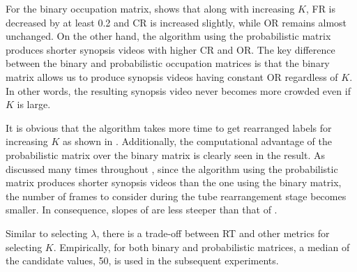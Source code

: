 \documentclass[11pt]{hyu_thesis}
\begin{document}
For the binary occupation matrix,  shows that along with increasing $K$, FR is decreased by at least 0.2 and CR is increased slightly, while OR remains almost unchanged. On the other hand, the algorithm using the probabilistic matrix produces shorter synopsis videos with higher CR and OR. The key difference between the binary and probabilistic occupation matrices is that the binary matrix allows us to produce synopsis videos having constant OR regardless of $K$. In other words, the resulting synopsis video never becomes more crowded even if $K$ is large.

It is obvious that the algorithm takes more time to get rearranged labels for increasing $K$ as shown in . Additionally, the computational advantage of the probabilistic matrix over the binary matrix is clearly seen in the result. As discussed many times throughout , since the algorithm using the probabilistic matrix produces shorter synopsis videos than the one using the binary matrix, the number of frames to consider during the tube rearrangement stage becomes smaller. In consequence, slopes of  are less steeper than that of .

Similar to selecting $\lambda$, there is a trade-off between RT and other metrics for selecting $K$. Empirically, for both binary and probabilistic matrices, a median of the candidate values, 50, is used in the subsequent experiments.

\tableQueueOne
{}\tableQueueTwo
{}\tableQueueThree
{}\tableQueueFour
{}\tableQueueFive

\tableProbQueueOne
{}\tableProbQueueTwo
{}\tableProbQueueThree
{}\tableProbQueueFour
{}\tableProbQueueFive
\end{document}
